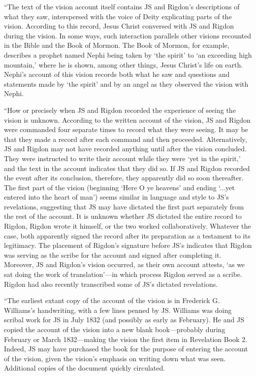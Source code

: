 			``The text of the vision account itself contains JS and Rigdon's descriptions of what they saw, interspersed with the voice of Deity explicating parts of the vision. According to this record, Jesus Christ conversed with JS and Rigdon during the vision. In some ways, such interaction parallels other visions recounted in the Bible and the Book of Mormon. The Book of Mormon, for example, describes a prophet named Nephi being taken by `the spirit' to `an exceeding high mountain,' where he is shown, among other things, Jesus Christ's life on earth. Nephi's account of this vision records both what he saw and questions and statements made by `the spirit' and by an angel as they observed the vision with Nephi.
			
			``How or precisely when JS and Rigdon recorded the experience of seeing the vision is unknown. According to the written account of the vision, JS and Rigdon were commanded four separate times to record what they were seeing. It may be that they made a record after each command and then proceeded. Alternatively, JS and Rigdon may not have recorded anything until after the vision concluded. They were instructed to write their account while they were `yet in the spirit,' and the text in the account indicates that they did so. If JS and Rigdon recorded the event after its conclusion, therefore, they apparently did so soon thereafter. The first part of the vision (beginning `Here O ye heavens' and ending `...yet entered into the heart of man') seems similar in language and style to JS's revelations, suggesting that JS may have dictated the first part separately from the rest of the account. It is unknown whether JS dictated the entire record to Rigdon, Rigdon wrote it himself, or the two worked collaboratively. Whatever the case, both apparently signed the record after its preparation as a testament to its legitimacy. The placement of Rigdon's signature before JS's indicates that Rigdon was serving as the scribe for the account and signed after completing it. Moreover, JS and Rigdon's vision occurred, as their own account attests, `as we sat doing the work of translation'---in which process Rigdon served as a scribe. Rigdon had also recently transcribed some of JS's dictated revelations.
			
			``The earliest extant copy of the account of the vision is in Frederick G. Williams's handwriting, with a few lines penned by JS. Williams was doing scribal work for JS in July 1832 (and possibly as early as February). He and JS copied the account of the vision into a new blank book---probably during February or March 1832---making the vision the first item in Revelation Book 2. Indeed, JS may have purchased the book for the purpose of entering the account of the vision, given the vision's emphasis on writing down what was seen. Additional copies of the document quickly circulated.
			
